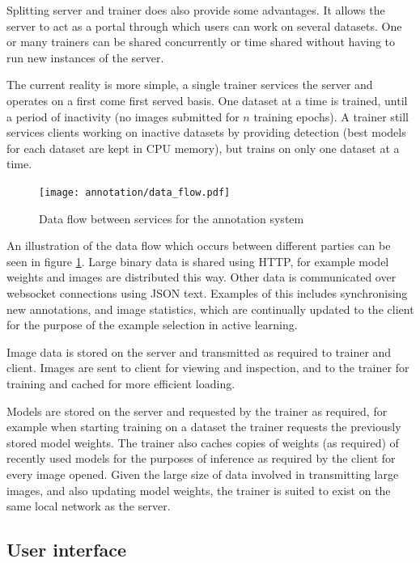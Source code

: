 Splitting server and trainer does also provide some advantages. It allows the server to act as a portal through which users can work on several datasets. One or many trainers can be shared concurrently or time shared without having to run new instances of the server. 

The current reality is more simple, a single trainer services the server and operates on a first come first served basis. One dataset at a time is trained, until a period of inactivity (no images submitted for $ n $ training epochs). A trainer still services clients working on inactive datasets by providing detection (best models for each dataset are kept in \gls{CPU} memory), but trains on only one dataset at a time. 

\begin{figure}[h!]
  \centering
  \texttt{[image: annotation/data\_flow.pdf]}
  \caption{Data flow between services for the annotation system}  
  \label{fig:data_flow}
\end{figure}

An illustration of the data flow which occurs between different parties can be seen in figure \ref{fig:data_flow}. Large binary data is shared using \gls{HTTP}, for example model weights and images are distributed this way. Other data is communicated over websocket connections using \gls{JSON} text. Examples of this includes synchronising new annotations, and image statistics, which are continually updated to the client for the purpose of the example selection in active learning.

Image data is stored on the server and transmitted as required to trainer and client. Images are sent to client for viewing and inspection, and to the trainer for training and cached for more efficient loading. 

Models are stored on the server and requested by the trainer as required, for example when starting training on a dataset the trainer requests the previously stored model weights. The trainer also caches copies of weights (as required) of recently used models for the purposes of inference as required by the client for every image opened. Given the large size of data involved in transmitting large images, and also updating model weights, the trainer is suited to exist on the same local network as the server. 



\subsection {User interface}

